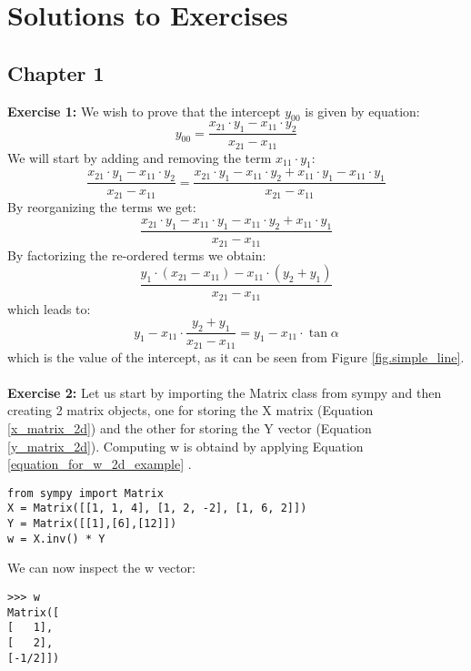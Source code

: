 \section{Solutions to Exercises}

\subsection{Chapter 1}
\textbf{Exercise 1:} We wish to prove that the intercept $y_{00}$ is given by equation: 
\begin{equation}
y_{00} = \frac{x_{21} \cdot y_1 - x_{11} \cdot y_2}{x_{21} - x_{11}}
\end{equation}
We will start by adding and removing the term $x_{11} \cdot y_1$:
\begin{equation}
\frac{x_{21} \cdot y_1 - x_{11} \cdot y_2 } {x_{21} - x_{11}}  = 
\frac{x_{21} \cdot y_1 - x_{11} \cdot y_2 + x_{11} \cdot y_1 - x_{11} \cdot y_1} {x_{21} - x_{11}} 
\end{equation}
By reorganizing the terms we get:
\begin{equation}
\frac{x_{21} \cdot y_1 - x_{11} \cdot y_1 - x_{11} \cdot y_2 + x_{11} \cdot y_1} {x_{21} - x_{11}} 
\end{equation}
By factorizing the re-ordered terms we obtain:
\begin{equation}
\frac{y_1 \cdot (x_{21} - x_{11}) - x_{11} \cdot (y_2 + y_1)} {x_{21} - x_{11}} 
\end{equation}
which leads to:
\begin{equation}
y_1 - x_{11} \cdot \frac{y_2 + y_1} {x_{21} - x_{11}} = y_1 - x_{11} \cdot \tan \alpha
\end{equation}
which is the value of the intercept, as it can be seen from Figure \ref{fig.simple_line}.
\\
\\

\textbf{Exercise 2:} 
Let us start by importing the Matrix class from sympy and then creating 2 matrix objects, one for storing the X matrix (Equation \ref{x_matrix_2d}) and the other for storing the Y vector (Equation \ref{y_matrix_2d}). Computing w is obtaind by applying Equation \ref{equation_for_w_2d_example}
. 
\begin{lstlisting}
from sympy import Matrix
X = Matrix([[1, 1, 4], [1, 2, -2], [1, 6, 2]])
Y = Matrix([[1],[6],[12]])
w = X.inv() * Y
\end{lstlisting}
We can now inspect the w vector:
\begin{lstlisting}
>>> w
Matrix([
[   1],
[   2],
[-1/2]])
\end{lstlisting}
